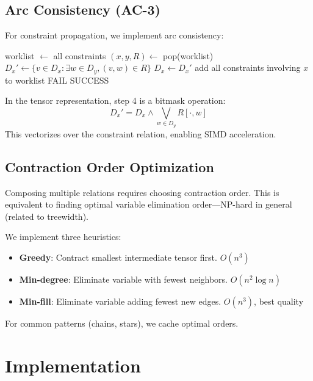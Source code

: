 \documentclass[11pt,a4paper]{article}
\begin{document}
\subsection{Arc Consistency (AC-3)}

For constraint propagation, we implement arc consistency:

\begin{algorithm}[ht]
\caption{AC-3 Domain Propagation}
\begin{algorithmic}[1]
\State worklist $\gets$ all constraints
  \State $(x, y, R) \gets$ pop(worklist)
  \State $D_x' \gets \{v \in D_x : \exists w \in D_y, (v,w) \in R\}$
    \State $D_x \gets D_x'$
    \State add all constraints involving $x$ to worklist
  \EndIf
    \State \Return FAIL
  \EndIf
\EndWhile
\State \Return SUCCESS
\end{algorithmic}
\end{algorithm}

In the tensor representation, step 4 is a bitmask operation:
\[
D_x' = D_x \land \bigvee_{w \in D_y} R[\cdot, w]
\]
This vectorizes over the constraint relation, enabling SIMD acceleration.

\subsection{Contraction Order Optimization}

Composing multiple relations requires choosing contraction order.
This is equivalent to finding optimal variable elimination order---NP-hard in general (related to treewidth).

We implement three heuristics:
\begin{itemize}
  \item \textbf{Greedy}: Contract smallest intermediate tensor first. $O(n^3)$
  \item \textbf{Min-degree}: Eliminate variable with fewest neighbors. $O(n^2 \log n)$
  \item \textbf{Min-fill}: Eliminate variable adding fewest new edges. $O(n^3)$, best quality
\end{itemize}

For common patterns (chains, stars), we cache optimal orders.

\section{Implementation}
\end{document}

